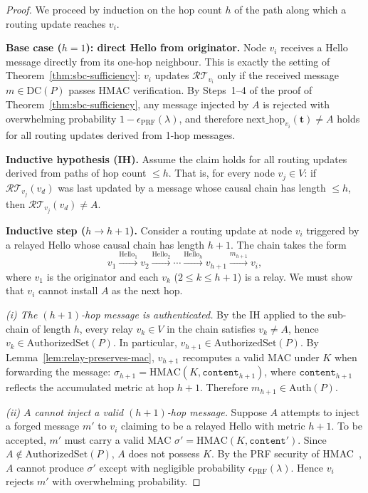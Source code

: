 \begin{proof}
We proceed by induction on the hop count $h$ of the path along which a
routing update reaches $v_i$.

\medskip
\noindent\textbf{Base case ($h = 1$): direct Hello from originator.}\;
Node $v_i$ receives a Hello message directly from its one-hop neighbour.
This is exactly the setting of Theorem~\ref{thm:sbc-sufficiency}:
$v_i$ updates $\mathcal{RT}_{v_i}$ only if the received message
$m \in \mathrm{DC}(P)$ passes HMAC verification.
By Steps~1--4 of the proof of Theorem~\ref{thm:sbc-sufficiency}, any
message injected by $A$ is rejected with overwhelming probability
$1 - \epsilon_{\mathrm{PRF}}(\lambda)$, and therefore
$\mathrm{next\_hop}_{v_i}(\mathbf{t}) \neq A$ holds for all
routing updates derived from 1-hop messages.

\medskip
\noindent\textbf{Inductive hypothesis (IH).}\;
Assume the claim holds for all routing updates derived from paths of
hop count $\le h$.  That is, for every node $v_j \in V$: if
$\mathcal{RT}_{v_j}(v_d)$ was last updated by a message whose causal
chain has length $\le h$, then $\mathcal{RT}_{v_j}(v_d) \neq A$.

\medskip
\noindent\textbf{Inductive step ($h \to h+1$).}\;
Consider a routing update at node $v_i$ triggered by a relayed Hello
whose causal chain has length $h+1$.  The chain takes the form
\[
  v_1
  \xrightarrow{\text{Hello}_{1}}
  v_2
  \xrightarrow{\text{Hello}_{2}}
  \cdots
  \xrightarrow{\text{Hello}_{h}}
  v_{h+1}
  \xrightarrow{m_{h+1}}
  v_i,
\]
where $v_1$ is the originator and each $v_k$ ($2 \le k \le h+1$) is a
relay.
We must show that $v_i$ cannot install $A$ as the next hop.

\medskip
\noindent\emph{(i) The $(h+1)$-hop message is authenticated.}\;
By the IH applied to the sub-chain of length $h$, every relay
$v_k \in V$ in the chain satisfies $v_k \neq A$, hence
$v_k \in \mathrm{AuthorizedSet}(P)$.
In particular, $v_{h+1} \in \mathrm{AuthorizedSet}(P)$.
By Lemma~\ref{lem:relay-preserves-mac}, $v_{h+1}$ recomputes a valid
MAC under $K$ when forwarding the message:
$\sigma_{h+1} = \mathrm{HMAC}(K, \texttt{content}_{h+1})$,
where $\texttt{content}_{h+1}$ reflects the accumulated metric at hop
$h+1$.
Therefore $m_{h+1} \in \mathrm{Auth}(P)$.

\medskip
\noindent\emph{(ii) $A$ cannot inject a valid $(h+1)$-hop message.}\;
Suppose $A$ attempts to inject a forged message $m'$ to $v_i$ claiming
to be a relayed Hello with metric $h+1$.
To be accepted, $m'$ must carry a valid MAC $\sigma' = \mathrm{HMAC}(K, \texttt{content}')$.
Since $A \notin \mathrm{AuthorizedSet}(P)$, $A$ does not possess $K$.
By the PRF security of HMAC~\cite{bellare1996keying}, $A$ cannot
produce $\sigma'$ except with negligible probability
$\epsilon_{\mathrm{PRF}}(\lambda)$.
Hence $v_i$ rejects $m'$ with overwhelming probability.


\end{proof}
